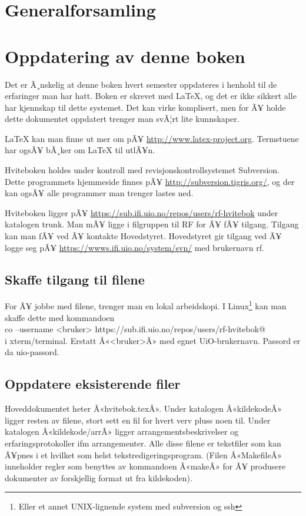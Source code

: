 \documentclass[11pt,norsk,a4paper,pointlessnumbers]{scrbook}
\begin{document}
\chapter{Generalforsamling}


\appendix

\chapter{Oppdatering av denne boken}
Det er Ã¸nskelig at denne boken hvert semester oppdateres i henhold til
de erfaringer man har hatt. Boken er skrevet med \LaTeX, og det er ikke
sikkert alle har kjennskap til dette systemet. Det kan virke komplisert,
men for Ã¥ holde dette dokumentet oppdatert trenger man svÃ¦rt lite
kunnskaper.

\LaTeX{} kan man finne ut mer om pÃ¥ \url{http://www.latex-project.org}. Termstuene
har ogsÃ¥ bÃ¸ker om \LaTeX{} til utlÃ¥n.

Hviteboken holdes under kontroll med revisjonskontrollsystemet Subversion.
Dette programmets hjemmeside finnes pÃ¥ \url{http://subversion.tigris.org/}, og
der kan ogsÃ¥ alle programmer man trenger lastes ned.

Hviteboken ligger pÃ¥ \url{https://sub.ifi.uio.no/repos/users/rf-hvitebok} under katalogen trunk.
Man mÃ¥ ligge i filgruppen til RF for Ã¥ fÃ¥ tilgang. Tilgang kan man fÃ¥ ved Ã¥ 
kontakte Hovedstyret. Hovedstyret gir tilgang ved Ã¥ logge seg pÃ¥ 
\url{https://wwws.ifi.uio.no/system/svn/} med brukernavn rf.

\section{Skaffe tilgang til filene}
For Ã¥ jobbe med filene, trenger man en lokal arbeidskopi. I Linux\footnote{Eller et annet UNIX-lignende system med subversion og ssh} kan man
skaffe dette med kommandoen\\
\verb@svn co --username <bruker> https://sub.ifi.uio.no/repos/users/rf-hvitebok@\\
i xterm/terminal. Erstatt Â«<bruker>Â» med egnet UiO-brukernavn. Passord er da uio-passord.

\section{Oppdatere eksisterende filer}
Hoveddokumentet heter Â«hvitebok.texÂ». Under katalogen Â«kildekodeÂ» ligger
resten av filene, stort sett en fil for hvert verv pluss noen til.
Under katalogen Â«kildekode/arrÂ» ligger arrangementsbeskrivelser og
erfaringsprotokoller ifm arrangementer. Alle disse filene er tekstfiler
som kan Ã¥pnes i et hvilket som helst tekstredigeringsprogram.
(Filen Â«MakefileÂ» inneholder regler som benyttes av kommandoen Â«makeÂ»
for Ã¥ produsere dokumenter av forskjellig format ut fra kildekoden).
\end{document}
